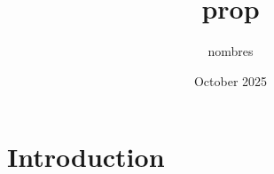 \documentclass{article}
\title{prop}
\author{nombres}
\date{October 2025}
\begin{document}
\maketitle

\tableofcontents

\newpage
\section{Introduction}


%

\newpage




\end{document}
